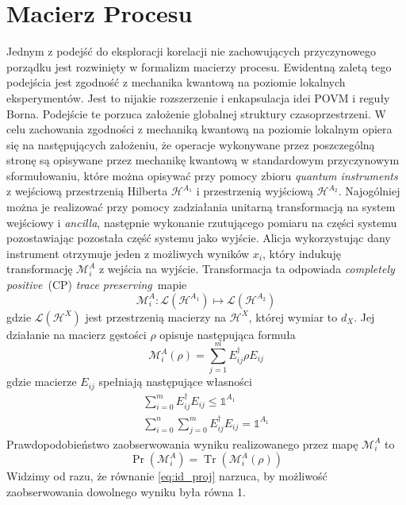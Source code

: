 \documentclass[10pt]{article} %
\DeclareMathOperator{\Trs}{Tr}
\newcommand{\Mats}[1]{\mathcal{L}(#1)}
\newcommand{\Hx}[1]{\mathcal{H}^{#1}}
\newcommand{\LHx}[1]{\Mats{\Hx{#1}}}
\newcommand{\MXi}[3]{\mathcal{M}^{#1}_{#2}(#3)}
\newcommand{\MXin}[2]{\mathcal{M}^{#1}_{#2}}
\newcommand{\MAin}[0]{\MXin{A}{i}}
\newcommand{\MAi}[1]{\MXi{A}{i}{#1}}
\newcommand{\MAir}{\MAi{\rho}}
\newcommand{\Idx}[1]{\mathbb{1}^{#1}}
\newcommand{\Tr}[1]{\Trs(#1)}
\newcommand{\Pro}[1]{\Pr(#1)}
\newcommand{\CP}{\textit{completely positive}}
\newcommand{\TP}{\textit{trace preserving}}
\begin{document}
\section{Macierz Procesu}
\label{macierz_procesu}
Jednym z podejść do eksploracji korelacji nie zachowujących przyczynowego porządku jest rozwinięty w \cite{process_matrix} formalizm macierzy procesu.
Ewidentną zaletą tego podejścia jest zgodność z mechanika kwantową na poziomie lokalnych eksperymentów. Jest to nijakie rozszerzenie i enkapsulacja idei POVM i reguły Borna. Podejście te porzuca założenie globalnej struktury czasoprzestrzeni. W celu zachowania zgodności z mechaniką kwantową na poziomie lokalnym opiera się na następujących założeniu, że operacje wykonywane przez poszczególną stronę są opisywane przez mechanikę kwantową w standardowym przyczynowym sformułowaniu, które można opisywać przy pomocy zbioru \textit{quantum instruments} \cite{quantum_instrument} z wejściową przestrzenią Hilberta $\mathcal{H}^{A_1}$ i przestrzenią wyjściową  $\mathcal{H}^{A_2}$. Najogólniej można je realizować przy pomocy zadziałania unitarną transformacją na system wejściowy i \textit{ancilla}, następnie wykonanie rzutującego pomiaru na części systemu pozostawiając pozostała część systemu jako wyjście. Alicja wykorzystując dany instrument otrzymuje jeden z możliwych wyników $x_i$, który indukuję transformację $\mathcal{M}^A_i$ z wejścia na wyjście. Transformacja ta odpowiada \CP~(CP) \TP~mapie
\begin{equation}
\mathcal{M}^A_i : \mathcal{L}(\mathcal{H}^{A_1}) \mapsto \mathcal{L}(\mathcal{H}^{A_2})
\end{equation}
gdzie $\LHx{X}$ jest przestrzenią macierzy na $\Hx{X}$, której wymiar to $d_X$. Jej działanie na macierz gęstości $\rho$ opisuje następująca formuła
\begin{equation}
\label{yolo}
\MAi{\rho} = \sum^m_{j=1} E_{ij} ^\dag \rho E_{ij}
\end{equation}
gdzie macierze $E_{ij}$ spełniają następujące własności 
\begin{gather}
\sum^m_{i=0} E_{ij}^\dag E_{ij} \leq \Idx{A_1} \\
\label{eq:id_proj} 
\sum^n_{i=0} \sum^m_{j=0} E_{ij}^\dag E_{ij} = \Idx{A_1}
\end{gather}
Prawdopodobieństwo zaobserwowania wyniku realizowanego przez mapę $\MAin$ to
\begin{equation}
\Pro{\MAin} = \Tr{\MAir}
\end{equation}
Widzimy od razu, że równanie \eqref{eq:id_proj} narzuca, by możliwość zaobserwowania dowolnego wyniku była równa 1.
\end{document}
